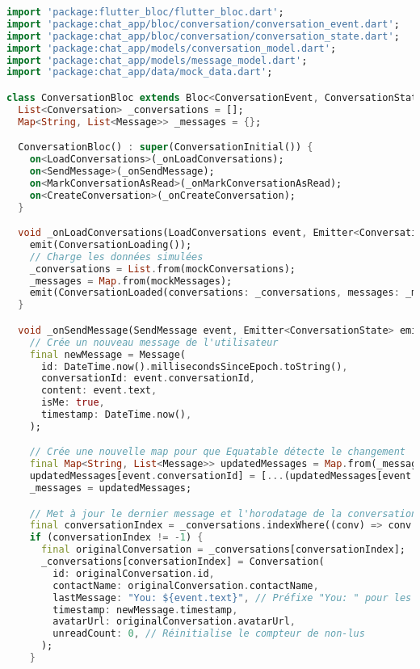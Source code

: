 \begin{lstlisting}[language=Dart, caption=Implémentation du ConversationBloc, style=dartstyle]
import 'package:flutter_bloc/flutter_bloc.dart';
import 'package:chat_app/bloc/conversation/conversation_event.dart';
import 'package:chat_app/bloc/conversation/conversation_state.dart';
import 'package:chat_app/models/conversation_model.dart';
import 'package:chat_app/models/message_model.dart';
import 'package:chat_app/data/mock_data.dart';

class ConversationBloc extends Bloc<ConversationEvent, ConversationState> {
  List<Conversation> _conversations = [];
  Map<String, List<Message>> _messages = {};

  ConversationBloc() : super(ConversationInitial()) {
    on<LoadConversations>(_onLoadConversations);
    on<SendMessage>(_onSendMessage);
    on<MarkConversationAsRead>(_onMarkConversationAsRead);
    on<CreateConversation>(_onCreateConversation);
  }

  void _onLoadConversations(LoadConversations event, Emitter<ConversationState> emit) {
    emit(ConversationLoading());
    // Charge les données simulées
    _conversations = List.from(mockConversations);
    _messages = Map.from(mockMessages);
    emit(ConversationLoaded(conversations: _conversations, messages: _messages));
  }

  void _onSendMessage(SendMessage event, Emitter<ConversationState> emit) {
    // Crée un nouveau message de l'utilisateur
    final newMessage = Message(
      id: DateTime.now().millisecondsSinceEpoch.toString(),
      conversationId: event.conversationId,
      content: event.text,
      isMe: true,
      timestamp: DateTime.now(),
    );

    // Crée une nouvelle map pour que Equatable détecte le changement
    final Map<String, List<Message>> updatedMessages = Map.from(_messages);
    updatedMessages[event.conversationId] = [...(updatedMessages[event.conversationId] ?? []), newMessage];
    _messages = updatedMessages;

    // Met à jour le dernier message et l'horodatage de la conversation
    final conversationIndex = _conversations.indexWhere((conv) => conv.id == event.conversationId);
    if (conversationIndex != -1) {
      final originalConversation = _conversations[conversationIndex];
      _conversations[conversationIndex] = Conversation(
        id: originalConversation.id,
        contactName: originalConversation.contactName,
        lastMessage: "You: ${event.text}", // Préfixe "You: " pour les messages de l'utilisateur
        timestamp: newMessage.timestamp,
        avatarUrl: originalConversation.avatarUrl, 
        unreadCount: 0, // Réinitialise le compteur de non-lus
      );
    }
    

\end{lstlisting}
